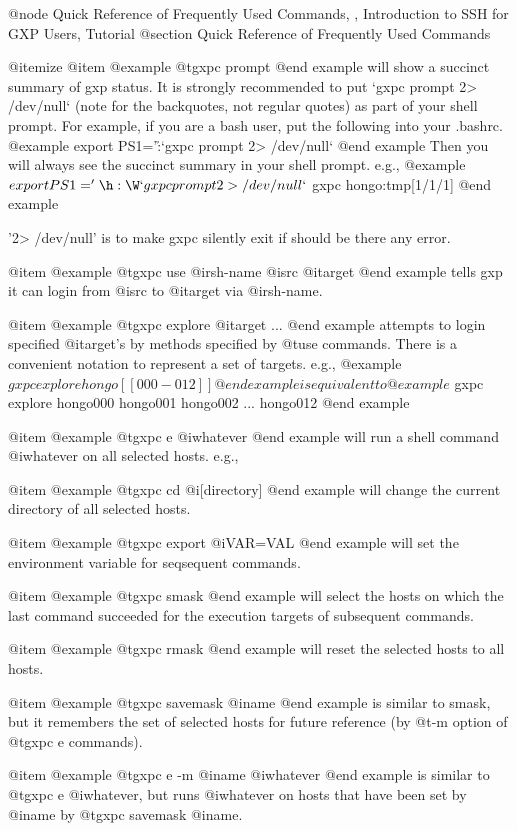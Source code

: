 @node Quick Reference of Frequently Used Commands,  , Introduction to SSH for GXP Users, Tutorial
@section Quick Reference of Frequently Used Commands

@itemize
@item 
@example
@t{gxpc prompt}
@end example
will show a succinct summary of gxp status.  It is strongly
recommended to put `gxpc prompt 2> /dev/null` 
(note for the backquotes, not regular
quotes) as part of your shell prompt. For example, if you are a bash
user, put the following into your .bashrc.
@example
export PS1='\h:\W`gxpc prompt 2> /dev/null`%
@end example
Then you will always see the succinct summary in your shell prompt. e.g.,
@example
$ export PS1='\h:\W`gxpc prompt 2> /dev/null`%
$ gxpc
hongo:tmp[1/1/1]%
@end example

'2> /dev/null' is to make gxpc silently exit if should be there any
error.

@item 
@example
@t{gxpc use} @i{rsh-name} @i{src} @i{target}
@end example
tells gxp it can login
from @i{src} to @i{target} via @i{rsh-name}. 

@item
@example
@t{gxpc explore} @i{target} ...
@end example
attempts to login specified @i{target}'s by methods specified by @t{use} 
commands.
There is a convenient notation to represent a set of targets. e.g.,
@example
$ gxpc explore hongo[[000-012]]
@end example
is equivalent to
@example
$ gxpc explore hongo000 hongo001 hongo002 ... hongo012
@end example

@item 
@example
@t{gxpc e} @i{whatever}
@end example
will run a shell command @i{whatever} on 
all selected hosts. e.g.,

@item 
@example
@t{gxpc cd} @i{[directory]}
@end example
will change the current directory of all selected hosts. 

@item 
@example
@t{gxpc export} @i{VAR=VAL}
@end example
will set the environment variable for seqsequent commands. 

@item 
@example
@t{gxpc smask}
@end example
will select the hosts on which the last command succeeded
for the execution targets of subsequent commands.

@item 
@example
@t{gxpc rmask}
@end example
will reset the selected hosts to all hosts.

@item 
@example
@t{gxpc savemask} @i{name}
@end example
is similar to smask, but it remembers the set of selected hosts
for future reference (by @t{-m} option of @t{gxpc e} commands).

@item 
@example
@t{gxpc e} -m @i{name} @i{whatever}
@end example
is similar to @t{gxpc e} @i{whatever}, but runs @i{whatever} on
hosts that have been set by @i{name} by @t{gxpc savemask} @i{name}.


